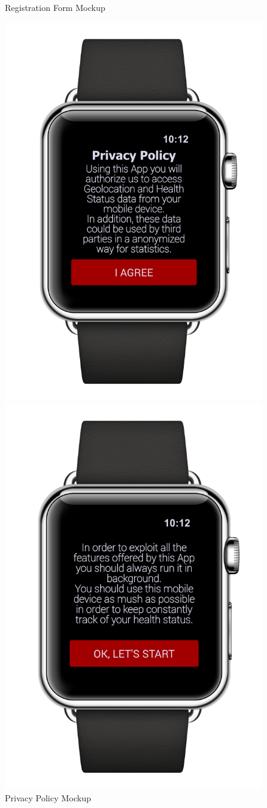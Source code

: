 \begin{enumerate}
\begin{figure}[H]
\begin{center}
\begin{minipage}[c]{.40\textwidth}
	\caption{Registration Form  Mockup}
        \end{minipage}
      \end{center}
\end{figure}
\begin{figure}[H]
\begin{center}
        \begin{minipage}[c]{.40\textwidth}
	\centering
          \includegraphics[height=9.5  cm]{Images/Mockups/AutomatedSOSMockup2.png}
	\caption{Privacy Policy Mockup}
        \end{minipage}%
        \hspace{10mm}%
        \begin{minipage}[c]{.40\textwidth}
	\centering
          \includegraphics[height=9.5 cm]{Images/Mockups/AutomatedSOSMockup4.png}

\end{minipage}
\end{center}
\end{figure}
\end{enumerate}
